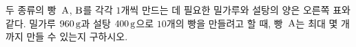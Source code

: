 \noindent\begin{minipage}[t]{0.58\linewidth}\vspace{0pt}\raggedright 두 종류의 빵~$\mathrm{A}$, $\mathrm{B}$를 각각 $1$개씩 만드는 데 필요한 밀가루와 설탕의 양은 오른쪽 표와 같다. 밀가루 $960\mkern3mu \mathrm{g}$과 설탕 $400\mkern3mu \mathrm{g}$으로 $10$개의 빵을 만들려고 할 때, 빵~$\mathrm{A}$는 최대 몇 개까지 만들 수 있는지 구하시오.\end{minipage}\hfill\begin{minipage}[t]{0.4\linewidth}\vspace{0pt}\centering \resizebox{\ifdim\width>\linewidth\linewidth\else\width\fi}{!}{}\end{minipage}\par
